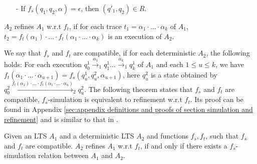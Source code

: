 {\begin{definition}[$f_s$-Simulation]
\begin{itemize}
\item[-] If $f_s(q_1,q_2,\alpha) = \epsilon$, then $(q'_1,q_2) \in R$.
\end{itemize}
\end{definition}


\begin{definition}[refinement w.r.t $f_t$]
\label{definition:ft refinement}
$A_2$ refines $A_1$ w.r.t $f_t$, if for each trace $t_1 = \alpha_1 \cdot \ldots \cdot \alpha_k$ of $A_1$, $t_2 = f_t(\alpha_1) \cdot \ldots \cdot f_t(\alpha_1 \cdot \ldots \cdot \alpha_k)$ is an execution of $A_2$.
\end{definition}



We say that $f_s$ and $f_t$ are compatible, if for each deterministic $A_2$, the following holds: For each execution %
$q_{0}^1 {\xrightarrow{\alpha_1}}_1 q_{1}^1 \ldots {\xrightarrow{\alpha_k}}_1 q_{k}^1$ of $A_1$ and each $1 \leq u \leq k$, we have $f_t(\alpha_1 \cdot \ldots \cdot \alpha_{u+1}) = f_s(q_{u}^1,q_{u}^2,\alpha_{u+1})$, here $q_u^2$ is a state obtained by $q_{0}^2 {\xrightarrow{f_t(\alpha_1) \cdot \ldots \cdot f_t(\alpha_1 \cdot \ldots \cdot \alpha_u) }}_2 q_u^2$. %
The following theorem states that $f_s$ and $f_t$ are compatible, $f_s$-simulation is equivalent to refinement w.r.t $f_t$. Its proof can be found in Appendix \ref{sec:appendix definitions and proofs of section simulation and refinement} and is similar to that in \cite{Abadi:1991,Lynch:1995}.


\begin{theorem}
\label{theorem:equivalence of our simulation and refinement}
Given an LTS $A_1$ and a deterministic LTS $A_2$ and functions $f_s,f_t$, such that $f_s$ and $f_t$ are compatible. $A_2$ refines $A_1$ w.r.t $f_t$, if and only if there exists a $f_s$-simulation relation between $A_1$ and $A_2$.
\end{theorem}
}
